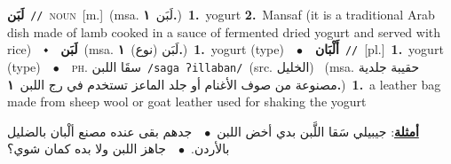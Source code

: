 \documentclass[10pt,a4paper,twoside]{article} %
\begin{document}
\begin{multicols}{2}
{\setlength\topsep{0pt}\textbf{\foreignlanguage{arabic}{لَبَن}}\ {\color{gray}\texttt{//}\color{black}}\ \textsc{noun}\ [m.]\ \color{gray}(msa. \foreignlanguage{arabic}{لَبَن}~\foreignlanguage{arabic}{\textbf{١.}})\color{black}\ \textbf{1.}~yogurt  \textbf{2.}~Mansaf (it is a traditional Arab dish made of lamb cooked in a sauce of fermented dried yogurt and served with rice)\ \ $\smblkdiamond$\ \ \setlength\topsep{0pt}\textbf{\foreignlanguage{arabic}{لَبَن}}\ \color{gray}(msa. \foreignlanguage{arabic}{لَبَن (نوع)}~\foreignlanguage{arabic}{\textbf{١.}})\color{black}\ \textbf{1.}~yogurt (type)\ \ $\bullet$\ \ \setlength\topsep{0pt}\textbf{\foreignlanguage{arabic}{أَلْبَان}}\ {\color{gray}\texttt{//}\color{black}}\ [pl.]\ \textbf{1.}~yogurt (type)\ \ $\bullet$\ \ \textsc{ph.} \color{gray} \foreignlanguage{arabic}{سقَا اللبن}\color{black}\ {\color{gray}\texttt{/{\sffamily saɡa ʔillaban}/}\color{black}}\ \color{gray}(src. \foreignlanguage{arabic}{الخليل})\color{black}\ \color{gray} (msa. \foreignlanguage{arabic}{حقيبة جلدية مصنوعة من صوف الأغنام أو جلد الماعز تستخدم في رج اللبن}~\foreignlanguage{arabic}{\textbf{١.}})\color{black}\ \textbf{1.}~a leather bag made from sheep wool or goat leather used for shaking the yogurt\  \begin{flushright}\color{gray}\foreignlanguage{arabic}{\textbf{\underline{\foreignlanguage{arabic}{أمثلة}}}: جيبيلي سَقا اللَّبن بدي أخض اللبن\ $\bullet$\ \  جدهم بقى عنده مصنع ألْبان بالضليل بالأردن.\ $\bullet$\ \  جاهز اللبن ولا بده كمان شوي؟}\end{flushright}\color{black}} \vspace{2mm}


\end{multicols}
\end{document}
